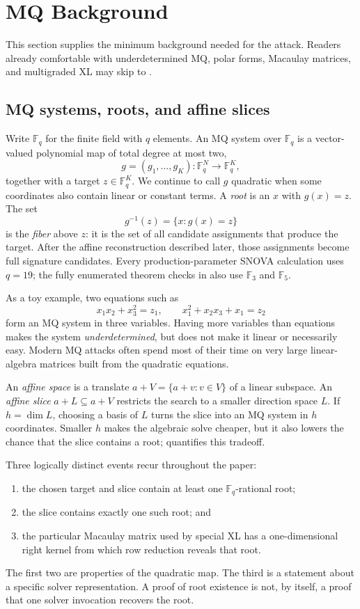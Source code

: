 \documentclass[11pt]{article}
\newcommand{\F}{\mathbb F}
\newcommand{\SNOVA}{\textsf{SNOVA}}
\begin{document}
\section{MQ Background}\label{sec:mq-background}

This section supplies the minimum background needed for the attack.  Readers
already comfortable with underdetermined MQ, polar forms, Macaulay matrices,
and multigraded XL may skip to .

\subsection{MQ systems, roots, and affine slices}\label{sec:mq-primer}

Write $\F_q$ for the finite field with $q$ elements.  An MQ system over
$\F_q$ is a vector-valued polynomial map of total degree at most two,
\[
  g=(g_1,\ldots,g_K):\F_q^N\longrightarrow\F_q^K,
\]
together with a target $z\in\F_q^K$.  We continue to call $g$ quadratic when
some coordinates also contain linear or constant terms.  A \emph{root} is an
$x$ with $g(x)=z$.
The set
\[
  g^{-1}(z)=\{x:g(x)=z\}
\]
is the \emph{fiber} above $z$: it is the set of all candidate assignments
that produce the target.  After the affine reconstruction described later,
those assignments become full signature candidates.  Every
production-parameter \SNOVA{} calculation uses $q=19$; the fully enumerated
theorem checks in  also use $\F_3$ and $\F_5$.

As a toy example, two equations such as
\[
 x_1x_2+x_3^2=z_1,
 \qquad
 x_1^2+x_2x_3+x_1=z_2
\]
form an MQ system in three variables.  Having more variables than equations
makes the system \emph{underdetermined}, but does not make it linear or
necessarily easy.  Modern MQ attacks often spend most of their time on very
large linear-algebra matrices built from the quadratic equations.

An \emph{affine space} is a translate $a+V=\{a+v:v\in V\}$ of a linear
subspace.  An \emph{affine slice} $a+L\subseteq a+V$ restricts the search to a
smaller direction space $L$.  If $h=\dim L$, choosing a basis of $L$ turns the
slice into an MQ system in $h$ coordinates.  Smaller $h$ makes the algebraic
solve cheaper, but it also lowers the chance that the slice contains a root;
 quantifies this tradeoff.

Three logically distinct events recur throughout the paper:
\begin{enumerate}[label=(\roman*),itemsep=2pt]
\item the chosen target and slice contain at least one $\F_q$-rational root;
\item the slice contains exactly one such root; and
\item the particular Macaulay matrix used by special XL has a one-dimensional
      right kernel from which row reduction reveals that root.
\end{enumerate}
The first two are properties of the quadratic map.  The third is a statement
about a specific solver representation.  A proof of root existence is not, by
itself, a proof that one solver invocation recovers the root.
\end{document}
